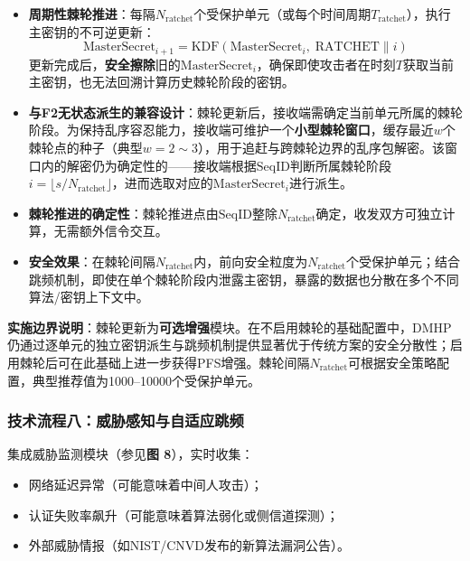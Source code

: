 ﻿\documentclass[12pt,a4paper]{article}
\begin{document}
\begin{itemize}
    \item \textbf{周期性棘轮推进}：每隔$N_{\text{ratchet}}$个受保护单元（或每个时间周期$T_{\text{ratchet}}$），执行主密钥的不可逆更新：
    \begin{equation}
        \text{MasterSecret}_{i+1} = \text{KDF}(\text{MasterSecret}_i, \; \text{RATCHET} \| i)
    \end{equation}
    更新完成后，\textbf{安全擦除}旧的$\text{MasterSecret}_i$，确保即使攻击者在时刻$T$获取当前主密钥，也无法回溯计算历史棘轮阶段的密钥。
    \item \textbf{与F2无状态派生的兼容设计}：棘轮更新后，接收端需确定当前单元所属的棘轮阶段。为保持乱序容忍能力，接收端可维护一个\textbf{小型棘轮窗口}，缓存最近$w$个棘轮点的种子（典型$w=2\sim3$），用于追赶与跨棘轮边界的乱序包解密。该窗口内的解密仍为确定性的——接收端根据$\text{SeqID}$判断所属棘轮阶段$i = \lfloor s / N_{\text{ratchet}} \rfloor$，进而选取对应的$\text{MasterSecret}_i$进行派生。
    \item \textbf{棘轮推进的确定性}：棘轮推进点由$\text{SeqID}$整除$N_{\text{ratchet}}$确定，收发双方可独立计算，无需额外信令交互。
    \item \textbf{安全效果}：在棘轮间隔$N_{\text{ratchet}}$内，前向安全粒度为$N_{\text{ratchet}}$个受保护单元；结合跳频机制，即使在单个棘轮阶段内泄露主密钥，暴露的数据也分散在多个不同算法/密钥上下文中。
\end{itemize}

\textbf{实施边界说明}：棘轮更新为\textbf{可选增强}模块。在不启用棘轮的基础配置中，DMHP仍通过逐单元的独立密钥派生与跳频机制提供显著优于传统方案的安全分散性；启用棘轮后可在此基础上进一步获得PFS增强。棘轮间隔$N_{\text{ratchet}}$可根据安全策略配置，典型推荐值为1000--10000个受保护单元。

\subsubsection{技术流程八：威胁感知与自适应跳频}

集成威胁监测模块（参见\textbf{图 8}），实时收集：

\begin{itemize}
    \item 网络延迟异常（可能意味着中间人攻击）；
    \item 认证失败率飙升（可能意味着算法弱化或侧信道探测）；
    \item 外部威胁情报（如NIST/CNVD发布的新算法漏洞公告）。
\end{itemize}
\end{document}
